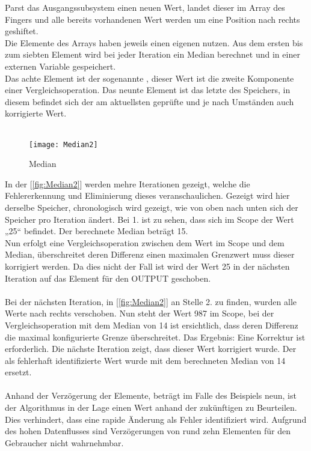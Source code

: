 \documentclass[titlepage,12pt,twoside]{article}
\begin{document}
Parst das Ausgangssubsystem einen neuen Wert, landet dieser im Array des Fingers und alle bereits vorhandenen Wert werden um eine Position nach rechts 
geshiftet. \\
Die Elemente des Arrays haben jeweils einen eigenen nutzen. Aus dem ersten bis zum siebten Element wird bei jeder Iteration ein Median berechnet und in 
einer externen Variable gespeichert. \\
Das achte Element ist der sogenannte , dieser Wert ist die zweite Komponente einer Vergleichsoperation. Das neunte Element ist das letzte des 
Speichers, in diesem befindet sich der am aktuellsten geprüfte und je nach Umständen auch korrigierte Wert. \\
\\
\begin{figure}[H]
	\begin{center}
		\scalebox{0.8}
		{\texttt{[image: Median2]}}
		\caption{Median}
		\label{fig:Median2}		
	\end{center}
\end{figure}
\hfill \break
In der [\textcolor{blue}{\autoref{fig:Median2}}] werden mehre Iterationen gezeigt, welche die Fehlererkennung und Eliminierung dieses veranschaulichen. Gezeigt wird hier derselbe 
Speicher, chronologisch wird gezeigt, wie von oben nach unten sich der Speicher pro Iteration ändert. Bei 1. ist zu sehen, dass sich im Scope der Wert 
„25“ befindet. Der berechnete Median beträgt 15. \\
Nun erfolgt eine Vergleichsoperation zwischen dem Wert im Scope und dem Median, überschreitet deren Differenz einen maximalen Grenzwert muss dieser 
korrigiert werden. Da dies nicht der Fall ist wird der Wert 25 in der nächsten Iteration auf das Element für den OUTPUT geschoben. \\
\\
Bei der nächsten Iteration, in [\textcolor{blue}{\autoref{fig:Median2}}] an Stelle 2. zu finden, wurden alle Werte nach rechts verschoben. Nun steht der Wert 987 im Scope, bei der 
Vergleichsoperation mit dem Median von 14 ist ersichtlich, dass deren Differenz die maximal konfigurierte Grenze überschreitet. Das Ergebnis: Eine 
Korrektur ist erforderlich. Die nächste Iteration zeigt, dass dieser Wert korrigiert wurde. Der als fehlerhaft identifizierte Wert wurde mit dem 
berechneten Median von 14 ersetzt. \\ 
\\
Anhand der Verzögerung der Elemente, beträgt im Falle des Beispiels neun, ist der Algorithmus in der Lage einen Wert anhand der zukünftigen zu Beurteilen. 
Dies verhindert, dass eine rapide Änderung als Fehler identifiziert wird. Aufgrund des hohen Datenflusses sind Verzögerungen von rund zehn Elementen für 
den Gebraucher nicht wahrnehmbar. \\
\\
\end{document}
